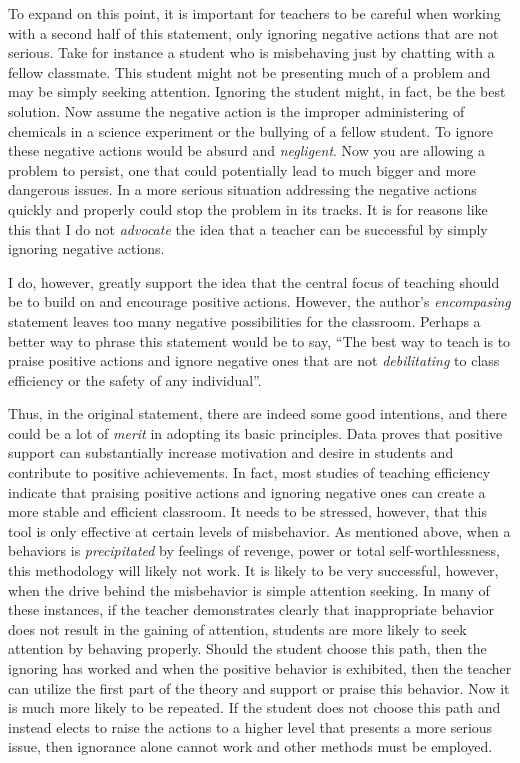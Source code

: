 To expand on this point, it is important for teachers to be careful when working with a second half of this statement, only ignoring negative actions that are not serious.
Take for instance a student who is misbehaving just by chatting with a fellow classmate.
This student might not be presenting much of a problem and may be simply seeking attention.
Ignoring the student might, in fact, be the best solution.
Now assume the negative action is the improper administering of chemicals in a science experiment or the bullying of a fellow student.
To ignore these negative actions would be absurd and \emph{negligent}.
Now you are allowing a problem to persist, one that could potentially lead to much bigger and more dangerous issues.
In a more serious situation addressing the negative actions quickly and properly could stop the problem in its tracks.
It is for reasons like this that I do not \emph{advocate} the idea that a teacher can be successful by simply ignoring negative actions.

I do, however, greatly support the idea that the central focus of teaching should be to build on and encourage positive actions.
However, the author's \emph{encompasing} statement leaves too many negative possibilities for the classroom.
Perhaps a better way to phrase this statement would be to say, ``The best way to teach is to praise positive actions and ignore negative ones that are not \emph{debilitating} to class efficiency or the safety of any individual''.

Thus, in the original statement, there are indeed some good intentions, and there could be a lot of \emph{merit} in adopting its basic principles.
Data proves that positive support can substantially increase motivation and desire in students and contribute to positive achievements.
In fact, most studies of teaching efficiency indicate that praising positive actions and ignoring negative ones can create a more stable and efficient classroom.
It needs to be stressed, however, that this tool is only effective at certain levels of misbehavior.
As mentioned above, when a behaviors is \emph{precipitated} by feelings of revenge, power or total self-worthlessness, this methodology will likely not work.
It is likely to be very successful, however, when the drive behind the misbehavior is simple attention seeking.
In many of these instances, if the teacher demonstrates clearly that inappropriate behavior does not result in the gaining of attention, students are more likely to seek attention by behaving properly.
Should the student choose this path, then the ignoring has worked and when the positive behavior is exhibited, then the teacher can utilize the first part of the theory and support or praise this behavior.
Now it is much more likely to be repeated.
If the student does not choose this path and instead elects to raise the actions to a higher level that presents a more serious issue, then ignorance alone cannot work and other methods must be employed.

